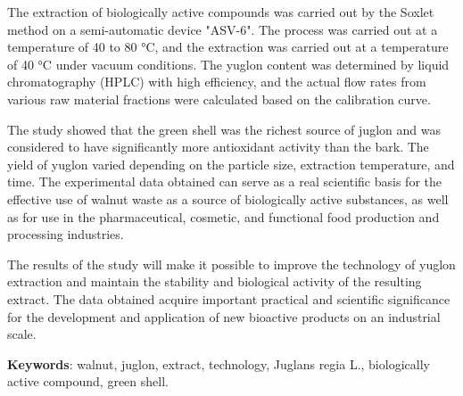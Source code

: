 The extraction of biologically active compounds was carried out by the
Soxlet method on a semi-automatic device "ASV-6". The process was
carried out at a temperature of 40 to 80 °C, and the extraction was
carried out at a temperature of 40 °C under vacuum conditions. The
yuglon content was determined by liquid chromatography (HPLC) with high
efficiency, and the actual flow rates from various raw material
fractions were calculated based on the calibration curve.

The study showed that the green shell was the richest source of juglon
and was considered to have significantly more antioxidant activity than
the bark. The yield of yuglon varied depending on the particle size,
extraction temperature, and time. The experimental data obtained can
serve as a real scientific basis for the effective use of walnut waste
as a source of biologically active substances, as well as for use in the
pharmaceutical, cosmetic, and functional food production and processing
industries.

The results of the study will make it possible to improve the technology
of yuglon extraction and maintain the stability and biological activity
of the resulting extract. The data obtained acquire important practical
and scientific significance for the development and application of new
bioactive products on an industrial scale.

{\bfseries Keywords}: walnut, juglon, extract, technology, Juglans regia
L., biologically active compound, green shell.

